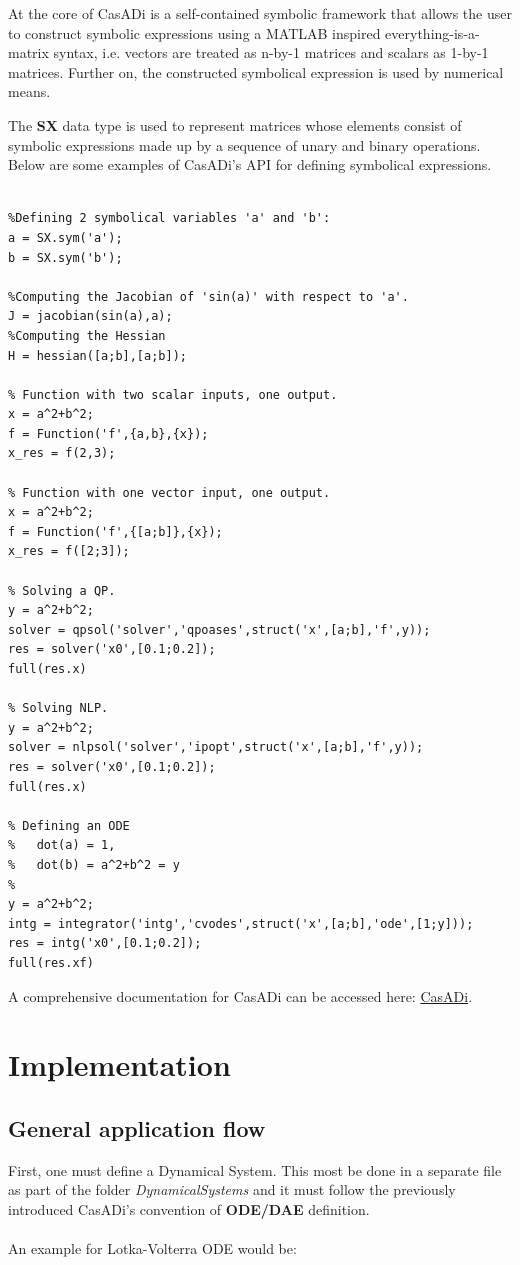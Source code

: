 \documentclass[12pt, letterpaper]{article}
\begin{document}
At the core of CasADi is a self-contained symbolic framework that allows the user to construct symbolic expressions using a MATLAB inspired everything-is-a-matrix syntax, i.e. vectors are treated as n-by-1 matrices and scalars as 1-by-1 matrices. Further on, the constructed symbolical expression is used by numerical means.

The \textbf{SX} data type is used to represent matrices whose elements consist of symbolic expressions made up by a sequence of unary and binary operations.
Below are some examples of CasADi's  API for defining symbolical expressions.

\begin{lstlisting}

%Defining 2 symbolical variables 'a' and 'b':
a = SX.sym('a');
b = SX.sym('b');

%Computing the Jacobian of 'sin(a)' with respect to 'a'.
J = jacobian(sin(a),a);
%Computing the Hessian
H = hessian([a;b],[a;b]);

% Function with two scalar inputs, one output.
x = a^2+b^2;
f = Function('f',{a,b},{x});
x_res = f(2,3);

% Function with one vector input, one output.
x = a^2+b^2;
f = Function('f',{[a;b]},{x});
x_res = f([2;3]);

% Solving a QP.
y = a^2+b^2;
solver = qpsol('solver','qpoases',struct('x',[a;b],'f',y));
res = solver('x0',[0.1;0.2]);
full(res.x)

% Solving NLP.
y = a^2+b^2;
solver = nlpsol('solver','ipopt',struct('x',[a;b],'f',y));
res = solver('x0',[0.1;0.2]);
full(res.x)

% Defining an ODE
%   dot(a) = 1,
%   dot(b) = a^2+b^2 = y
%  
y = a^2+b^2;
intg = integrator('intg','cvodes',struct('x',[a;b],'ode',[1;y]));
res = intg('x0',[0.1;0.2]);
full(res.xf)

\end{lstlisting}

A comprehensive documentation for CasADi can be accessed here: \href{https://web.casadi.org/docs/}{CasADi}.


\section{Implementation}
\label{implementation_section}

\subsection{General application flow}
First, one must define a Dynamical System. This most be done in a separate file as part of the folder  \textit{DynamicalSystems} and it must follow the previously introduced CasADi's convention of \textbf{ODE/DAE} definition. 
\\
\\
An example for Lotka-Volterra ODE would be:
\end{document}
